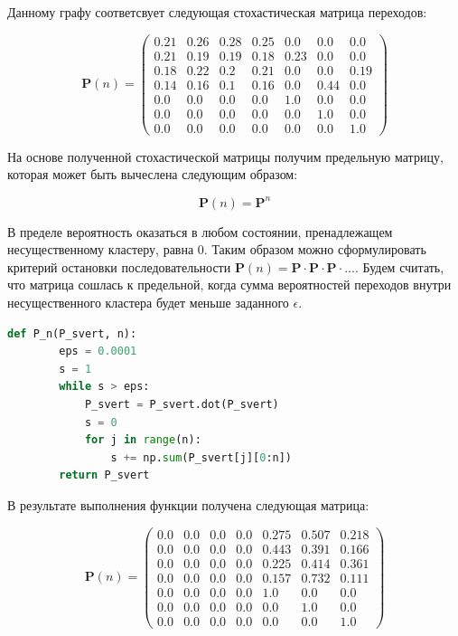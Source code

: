 Данному графу соответсвует следующая стохастическая матрица переходов:

$$
\mathbf{P}(n)=
\begin{pmatrix}
0.21 & 0.26 & 0.28 & 0.25 & 0.0 & 0.0 & 0.0 \\
0.21 & 0.19 & 0.19 & 0.18 & 0.23 & 0.0 & 0.0 \\
0.18 & 0.22 & 0.2 & 0.21 & 0.0 & 0.0 & 0.19 \\
0.14 & 0.16 & 0.1 & 0.16 & 0.0 & 0.44 & 0.0 \\
0.0 & 0.0 & 0.0 & 0.0 & 1.0 & 0.0 & 0.0 \\
0.0 & 0.0 & 0.0 & 0.0 & 0.0 & 1.0 & 0.0 \\
0.0 & 0.0 & 0.0 & 0.0 & 0.0 & 0.0 & 1.0 
\end{pmatrix}
$$

На основе полученной стохастической матрицы получим предельную матрицу, которая может быть вычеслена следующим образом:

$$
    \mathbf{P} (n) = \mathbf{P}^n
$$

В пределе вероятность оказаться в любом состоянии, пренадлежащем несущественному кластеру, равна 0.
Таким образом можно сформулировать критерий остановки последовательности $\mathbf{P} (n) = \mathbf{P} \cdot \mathbf{P} \cdot \mathbf{P} \cdot \dots$.
Будем считать, что матрица сошлась к предельной, когда сумма вероятностей переходов внутри несущественного кластера будет меньше заданного $\epsilon$.

\begin{lstlisting}[language=python, label=prog,caption={\textit{Нахождение предельной матрицы переходов}}]
    def P_n(P_svert, n):
        eps = 0.0001
        s = 1
        while s > eps:
            P_svert = P_svert.dot(P_svert)
            s = 0
            for j in range(n):
                s += np.sum(P_svert[j][0:n])
        return P_svert
\end{lstlisting}

В результате выполнения функции получена следующая матрица:

$$
\mathbf{P}(n)=
\begin{pmatrix}
 0.0 & 0.0 & 0.0 & 0.0 & 0.275 & 0.507 & 0.218 \\
0.0 & 0.0 & 0.0 & 0.0 & 0.443 & 0.391 & 0.166 \\
0.0 & 0.0 & 0.0 & 0.0 & 0.225 & 0.414 & 0.361 \\
0.0 & 0.0 & 0.0 & 0.0 & 0.157 & 0.732 & 0.111 \\
0.0 & 0.0 & 0.0 & 0.0 & 1.0 & 0.0 & 0.0 \\
0.0 & 0.0 & 0.0 & 0.0 & 0.0 & 1.0 & 0.0 \\
0.0 & 0.0 & 0.0 & 0.0 & 0.0 & 0.0 & 1.0 
\end{pmatrix}
$$

